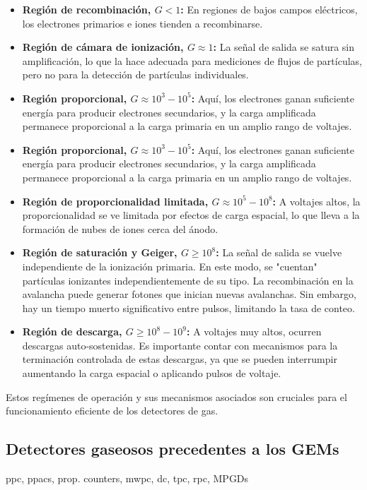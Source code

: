 \documentclass{article}
\begin{document}
\begin{itemize}
    \item \textbf{Región de recombinación, \(G < 1\):} En regiones de bajos campos eléctricos, los electrones primarios e iones tienden a recombinarse.
    \item \textbf{Región de cámara de ionización, \(G \approx 1\):} La señal de salida se satura sin amplificación, lo que la hace adecuada para mediciones de flujos de partículas, pero no para la detección de partículas individuales.
    \item \textbf{Región proporcional, \(G \approx 10^3 - 10^5\):} Aquí, los electrones ganan suficiente energía para producir electrones secundarios, y la carga amplificada permanece proporcional a la carga primaria en un amplio rango de voltajes.
    \item \textbf{Región proporcional, \(G \approx 10^3 - 10^5\):} Aquí, los electrones ganan suficiente energía para producir electrones secundarios, y la carga amplificada permanece proporcional a la carga primaria en un amplio rango de voltajes.
    \item \textbf{Región de proporcionalidad limitada, \(G \approx 10^5 - 10^8\):} A voltajes altos, la proporcionalidad se ve limitada por efectos de carga espacial, lo que lleva a la formación de nubes de iones cerca del ánodo.
    \item \textbf{Región de saturación y Geiger, \(G \geq 10^8\):} La señal de salida se vuelve independiente de la ionización primaria. En este modo, se "cuentan" partículas ionizantes independientemente de su tipo. La recombinación en la avalancha puede generar fotones que inician nuevas avalanchas. Sin embargo, hay un tiempo muerto significativo entre pulsos, limitando la tasa de conteo.
    \item \textbf{Región de descarga, \(G \geq 10^8 - 10^9\):} A voltajes muy altos, ocurren descargas auto-sostenidas. Es importante contar con mecanismos para la terminación controlada de estas descargas, ya que se pueden interrumpir aumentando la carga espacial o aplicando pulsos de voltaje.
\end{itemize}

\noindent Estos regímenes de operación y sus mecanismos asociados son cruciales para el funcionamiento eficiente de los detectores de gas.\\


\subsection{Detectores gaseosos precedentes a los GEMs}
ppc, ppacs, prop. counters, mwpc, dc, tpc, rpc, MPGDs
\end{document}
